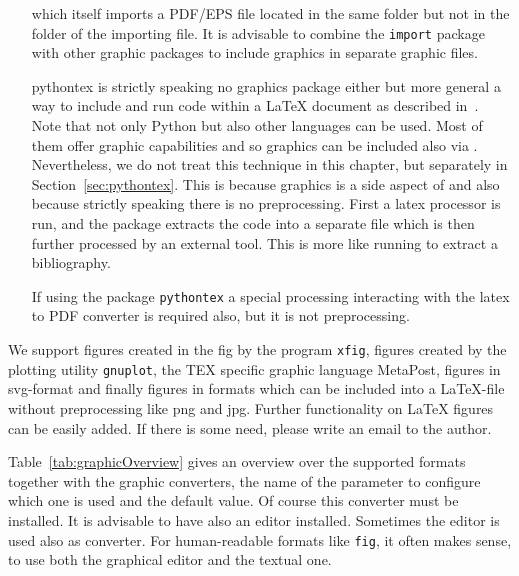 \begin{itemize}
which itself imports a PDF/EPS file located in the same folder 
but not in the folder of the importing file. 
It is advisable to combine the \texttt{import} package with other graphic packages 
to include graphics in separate graphic files. 
\item[pythontex]
is strictly speaking no graphics package either but more general 
a way to include and run code within a \LaTeX{} document 
as described in~\cite{PythonTexP}. 
Note that not only Python but also other languages can be used. 
Most of them offer graphic capabilities 
and so graphics can be included also via . 
Nevertheless, we do not treat this technique in this chapter, 
but separately in Section~\ref{sec:pythontex}. 
This is because graphics is a side aspect of  
and also because strictly speaking there is no preprocessing. 
First a latex processor is run, and the package extracts the code 
into a separate file which is then further processed by an external tool. 
This is more like running  to extract a bibliography. 

If using the package \texttt{pythontex} 
a special processing interacting with the latex to PDF converter is required also, 
but it is not preprocessing. 
\end{itemize}

We support figures created in the \gls{fig} by the program \texttt{xfig}, 
figures created by the plotting utility \texttt{gnuplot}, 
the TEX specific graphic language MetaPost, 
figures in \gls{svg}-format 
and finally figures in formats which can be included into a \LaTeX-file 
without preprocessing like \gls{png} and \gls{jpg}. 
Further functionality on \LaTeX{} figures can be easily added. 
If there is some need, please write an email to the author. 

Table~\ref{tab:graphicOverview} gives an overview over the supported formats 
together with the graphic converters, 
the name of the parameter to configure which one is used 
and the default value. 
Of course this converter must be installed. 
It is advisable to have also an editor installed. 
Sometimes the editor is used also as converter. 
For human-readable formats like \texttt{fig}, it often makes sense, 
to use both the graphical editor and the textual one. 

